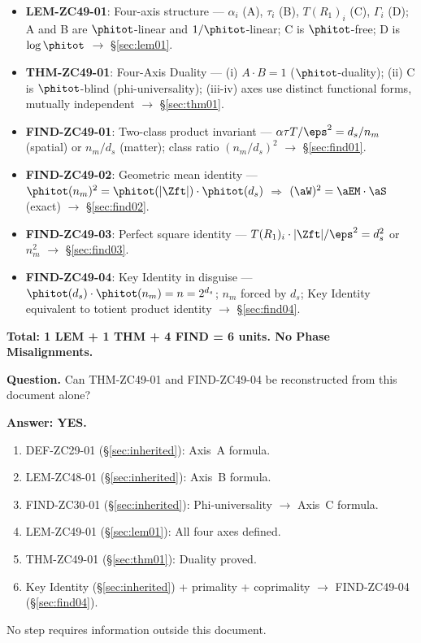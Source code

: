 \documentclass[12pt, a4paper]{article}
\begin{document}
\begin{formalbox}[title={Atomic Units Introduced by ZC49 (6 units)}]
\begin{itemize}[leftmargin=*, noitemsep]
  \item \textbf{LEM-ZC49-01}: Four-axis structure ---
    $\alpha_i$ (A), $\tau_i$ (B), $T(R_1)_i$ (C), $\Gamma_i$ (D);
    A and B are $\phitot$-linear and $1/\phitot$-linear;
    C is $\phitot$-free; D is $\log\phitot$
    $\to$ \S\ref{sec:lem01}.
  \item \textbf{THM-ZC49-01}: Four-Axis Duality ---
    (i) $A\cdot B = 1$ ($\phitot$-duality);
    (ii) C is $\phitot$-blind (phi-universality);
    (iii-iv) axes use distinct functional forms,
    mutually independent
    $\to$ \S\ref{sec:thm01}.
  \item \textbf{FIND-ZC49-01}: Two-class product invariant ---
    $\alpha\tau T/\eps^2 = d_s/n_m$ (spatial)
    or $n_m/d_s$ (matter); class ratio $(n_m/d_s)^2$
    $\to$ \S\ref{sec:find01}.
  \item \textbf{FIND-ZC49-02}: Geometric mean identity ---
    $\phitot(n_m)^2 = \phitot(|\Zft|)\cdot\phitot(d_s)$
    $\Rightarrow$ $(\aW)^2 = \aEM\cdot\aS$ (exact)
    $\to$ \S\ref{sec:find02}.
  \item \textbf{FIND-ZC49-03}: Perfect square identity ---
    $T(R_1)_i\cdot|\Zft|/\eps^2 = d_s^2$ or $n_m^2$
    $\to$ \S\ref{sec:find03}.
  \item \textbf{FIND-ZC49-04}: Key Identity in disguise ---
    $\phitot(d_s)\cdot\phitot(n_m) = n = 2^{d_s}$;
    $n_m$ forced by $d_s$; Key Identity equivalent to
    totient product identity
    $\to$ \S\ref{sec:find04}.
\end{itemize}
\textbf{Total: 1 LEM + 1 THM + 4 FIND = 6 units.
No Phase Misalignments.}
\end{formalbox}

\begin{formalbox}[title={Reconstruction Test (CUIP No-Loss)}]
\textbf{Question.} Can THM-ZC49-01 and FIND-ZC49-04 be
reconstructed from this document alone?

\textbf{Answer: YES.}
\begin{enumerate}[leftmargin=*, noitemsep]
  \item DEF-ZC29-01 (\S\ref{sec:inherited}): Axis~A formula.
  \item LEM-ZC48-01 (\S\ref{sec:inherited}): Axis~B formula.
  \item FIND-ZC30-01 (\S\ref{sec:inherited}):
    Phi-universality $\to$ Axis~C formula.
  \item LEM-ZC49-01 (\S\ref{sec:lem01}): All four axes defined.
  \item THM-ZC49-01 (\S\ref{sec:thm01}): Duality proved.
  \item Key Identity (\S\ref{sec:inherited})
    + primality + coprimality
    $\to$ FIND-ZC49-04 (\S\ref{sec:find04}).
\end{enumerate}
No step requires information outside this document.
\end{formalbox}
\end{document}
